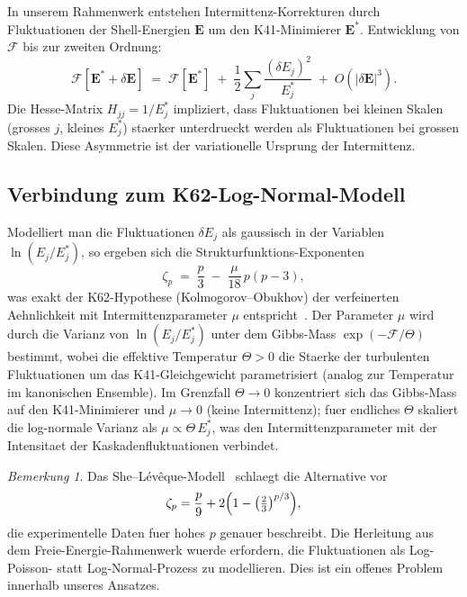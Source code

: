 \documentclass[12pt,a4paper]{article}
\theoremstyle{definition}
\theoremstyle{plain}
\theoremstyle{remark}
\newtheorem{remark}[definition]{Bemerkung}
\begin{document}
In unserem Rahmenwerk entstehen Intermittenz-Korrekturen durch Fluktuationen
der Shell-Energien $\mathbf{E}$ um den K41-Minimierer $\mathbf{E}^*$.
Entwicklung von $\mathcal{F}$ bis zur zweiten Ordnung:
\begin{equation}\label{eq:F_expand}
  \mathcal{F}[\mathbf{E}^* + \delta\mathbf{E}]
  \;=\;
  \mathcal{F}[\mathbf{E}^*]
  \;+\;
  \frac{1}{2}\sum_{j}
    \frac{(\delta E_j)^2}{E_j^*}
  \;+\; O(|\delta\mathbf{E}|^3).
\end{equation}
Die Hesse-Matrix $H_{jj} = 1/E_j^*$ impliziert, dass Fluktuationen bei
kleinen Skalen (grosses $j$, kleines $E_j^*$) staerker unterdrueckt werden
als Fluktuationen bei grossen Skalen. Diese Asymmetrie ist der variationelle
Ursprung der Intermittenz.

\subsection{Verbindung zum K62-Log-Normal-Modell}

Modelliert man die Fluktuationen $\delta E_j$ als gaussisch in der Variablen
$\ln(E_j/E_j^*)$, so ergeben sich die Strukturfunktions-Exponenten
\begin{equation}\label{eq:zeta_p}
  \zeta_p
  \;=\;
  \frac{p}{3}
  \;-\;
  \frac{\mu}{18}\,p(p-3),
\end{equation}
was exakt der K62-Hypothese (Kolmogorov--Obukhov) der verfeinerten
Aehnlichkeit mit Intermittenzparameter $\mu$ entspricht~\cite{K62,Frisch95}.
Der Parameter $\mu$ wird durch die Varianz von $\ln(E_j/E_j^*)$ unter dem
Gibbs-Mass $\exp(-\mathcal{F}/\Theta)$ bestimmt, wobei die effektive
Temperatur $\Theta > 0$ die Staerke der turbulenten Fluktuationen um das
K41-Gleichgewicht parametrisiert (analog zur Temperatur im kanonischen
Ensemble). Im Grenzfall $\Theta \to 0$ konzentriert sich das Gibbs-Mass
auf den K41-Minimierer und $\mu \to 0$ (keine Intermittenz); fuer
endliches $\Theta$ skaliert die log-normale Varianz als
$\mu \propto \Theta\,E_j^*$, was den Intermittenzparameter mit der
Intensitaet der Kaskadenfluktuationen verbindet.

\begin{remark}
Das She--L\'ev\^eque-Modell~\cite{SL94} schlaegt die Alternative vor
\[
  \zeta_p = \frac{p}{9} + 2\Bigl(1 - \bigl(\tfrac{2}{3}\bigr)^{p/3}\Bigr),
\]
die experimentelle Daten fuer hohes $p$ genauer beschreibt. Die Herleitung
aus dem Freie-Energie-Rahmenwerk wuerde erfordern, die Fluktuationen als
Log-Poisson- statt Log-Normal-Prozess zu modellieren. Dies ist ein offenes
Problem innerhalb unseres Ansatzes.
\end{remark}
\end{document}
